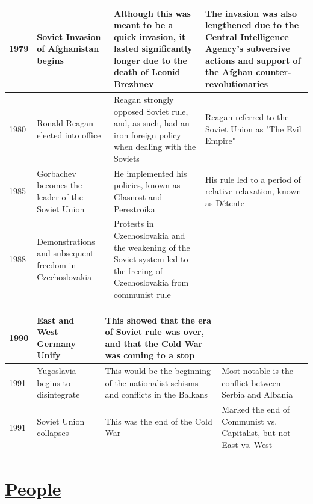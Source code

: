 \documentclass[12pt]{article}
\begin{document}
\begin{enumerate}
\begin{tabular}{|p{}|p{}|p{}|p{}|}
\hline
1979 & Soviet Invasion of Afghanistan begins  & Although this was meant to be a quick invasion, it lasted significantly longer due to the death of Leonid Brezhnev  & The invasion was also lengthened due to the Central Intelligence Agency's subversive actions and support of the Afghan counter-revolutionaries  \\
\hline
1980 & Ronald Reagan elected into office  & Reagan strongly opposed Soviet rule, and, as such, had an iron foreign policy when dealing with the Soviets  & Reagan referred to the Soviet Union as "The Evil Empire"  \\
\hline
1985 & Gorbachev becomes the leader of the Soviet Union  & He implemented his policies, known as Glasnost and Perestroika  & His rule led to a period of relative relaxation, known as D\'etente  \\
\hline
1988 & Demonstrations and subsequent freedom in Czechoslovakia  & Protests in Czechoslovakia and the weakening of the Soviet system led to the freeing of Czechoslovakia from communist rule  & \\
\hline
\end{tabular}
\newpage
\hspace{-25pt}\begin{tabular}{|p{}|p{}|p{}|p{}|}
\hline
1990 & East and West Germany Unify  & This showed that the era of Soviet rule was over, and that the Cold War was coming to a stop  &   \\
\hline
1991 & Yugoslavia begins to disintegrate & This would be the beginning of the nationalist schisms and conflicts in the Balkans  & Most notable is the conflict between Serbia and Albania  \\
\hline
1991 & Soviet Union collapses & This was the end of the Cold War  & Marked the end of Communist vs. Capitalist, but not East vs. West  \\
\hline
\end{tabular}


\section{\underline{People}}


\end{enumerate}
\end{document}
